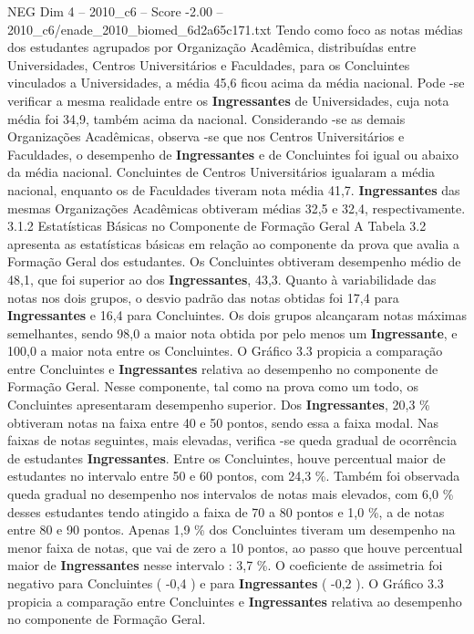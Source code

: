 \begin{textsample}{NEG Dim 4 – 2010\_c6 – Score -2.00 – 2010\_c6/enade\_2010\_biomed\_6d2a65c171.txt}
Tendo como foco as notas médias dos estudantes agrupados por Organização Acadêmica, distribuídas entre Universidades, Centros Universitários e Faculdades, para os Concluintes vinculados a Universidades, a média 45,6 ficou acima da média nacional.
Pode -se verificar a mesma realidade entre os \textbf{Ingressantes} de Universidades, cuja nota média foi 34,9, também acima da nacional.
Considerando -se as demais Organizações Acadêmicas, observa -se que nos Centros Universitários e Faculdades, o desempenho de \textbf{Ingressantes} e de Concluintes foi igual ou abaixo da média nacional.
Concluintes de Centros Universitários igualaram a média nacional, enquanto os de Faculdades tiveram nota média 41,7. \textbf{Ingressantes} das mesmas Organizações Acadêmicas obtiveram médias 32,5 e 32,4, respectivamente. 3.1.2 Estatísticas Básicas no Componente de Formação Geral A Tabela 3.2 apresenta as estatísticas básicas em relação ao componente da prova que avalia a Formação Geral dos estudantes.
Os Concluintes obtiveram desempenho médio de 48,1, que foi superior ao dos \textbf{Ingressantes}, 43,3.
Quanto à variabilidade das notas nos dois grupos, o desvio padrão das notas obtidas foi 17,4 para \textbf{Ingressantes} e 16,4 para Concluintes.
Os dois grupos alcançaram notas máximas semelhantes, sendo 98,0 a maior nota obtida por pelo menos um \textbf{Ingressante}, e 100,0 a maior nota entre os Concluintes.
O Gráfico 3.3 propicia a comparação entre Concluintes e \textbf{Ingressantes} relativa ao desempenho no componente de Formação Geral.
Nesse componente, tal como na prova como um todo, os Concluintes apresentaram desempenho superior.
Dos \textbf{Ingressantes}, 20,3 \% obtiveram notas na faixa entre 40 e 50 pontos, sendo essa a faixa modal.
Nas faixas de notas seguintes, mais elevadas, verifica -se queda gradual de ocorrência de estudantes \textbf{Ingressantes}.
Entre os Concluintes, houve percentual maior de estudantes no intervalo entre 50 e 60 pontos, com 24,3 \%.
Também foi observada queda gradual no desempenho nos intervalos de notas mais elevados, com 6,0 \% desses estudantes tendo atingido a faixa de 70 a 80 pontos e 1,0 \%, a de notas entre 80 e 90 pontos.
Apenas 1,9 \% dos Concluintes tiveram um desempenho na menor faixa de notas, que vai de zero a 10 pontos, ao passo que houve percentual maior de \textbf{Ingressantes} nesse intervalo : 3,7 \%.
O coeficiente de assimetria foi negativo para Concluintes ( -0,4 ) e para \textbf{Ingressantes} ( -0,2 ).
O Gráfico 3.3 propicia a comparação entre Concluintes e \textbf{Ingressantes} relativa ao desempenho no componente de Formação Geral.

\end{textsample}
